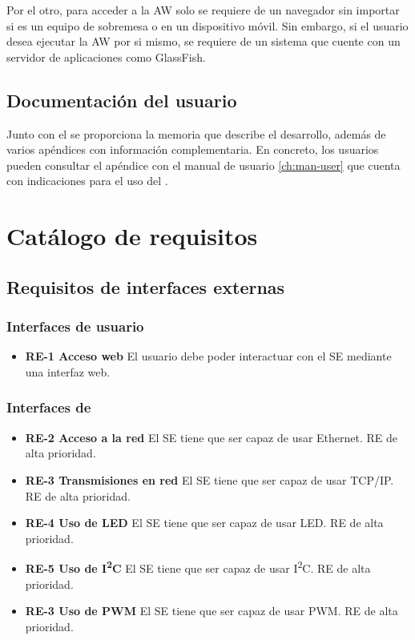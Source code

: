 Por el otro, para acceder a la AW solo se requiere de un navegador sin importar
si es un equipo de sobremesa o en un dispositivo móvil. Sin embargo,
si el usuario desea ejecutar la AW por si mismo, se requiere de un sistema
que cuente con un servidor de aplicaciones como GlassFish.

\subsection{Documentación del usuario} \label{sec:spec-docs}
Junto con el  se proporciona la memoria que describe
el desarrollo, además de varios apéndices con información complementaria. En
concreto, los usuarios pueden consultar el apéndice con el manual de usuario
\ref{ch:man-user} que cuenta con indicaciones para el uso del
.



\section{Catálogo de requisitos} \label{sec:requisitos}


\subsection{Requisitos de interfaces externas} \label{sec:spec-interfaces}
\subsubsection{Interfaces de usuario} \label{sec:spec-interfaces-usuario}
\begin{itemize}
  \item \textbf{RE-1 Acceso web} El usuario debe poder interactuar con el SE
  mediante una interfaz web.
\end{itemize}

\subsubsection{Interfaces de }
\label{sec:spec-interfaces-hw}
\begin{itemize}
  \item \textbf{RE-2 Acceso a la red} El SE tiene que ser capaz de usar
  Ethernet. RE de alta prioridad.
  \item \textbf{RE-3 Transmisiones en red} El SE tiene que ser capaz de usar
  TCP/IP. RE de alta prioridad.
  \item \textbf{RE-4 Uso de LED} El SE tiene que ser capaz de usar LED. RE de
  alta prioridad.
  \item \textbf{RE-5 Uso de I\textsuperscript{2}C} El SE tiene que ser
  capaz de usar I\textsuperscript{2}C. RE de alta prioridad.
  \item \textbf{RE-3 Uso de PWM} El SE tiene que ser capaz de usar PWM. RE de
  alta prioridad.
\end{itemize}

